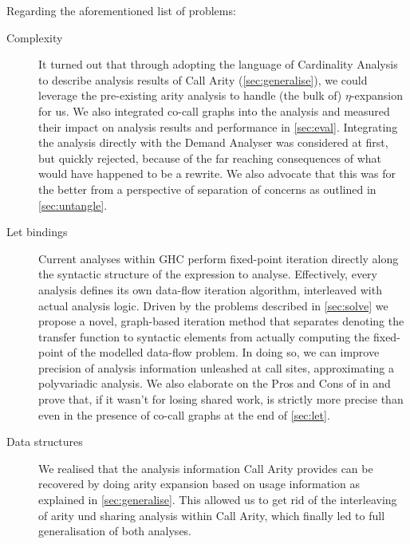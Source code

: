 Regarding the aforementioned list of problems:
\begin{description}
  \item[Complexity]
    It turned out that through adopting the language of Cardinality Analysis to describe analysis results of Call Arity (\cf \cref{sec:generalise}), we could leverage the pre-existing arity analysis to handle (the bulk of) $\eta$-expansion for us.
    We also integrated co-call graphs into the analysis and measured their impact on analysis results and performance in \cref{sec:eval}.
    Integrating the analysis directly with the Demand Analyser was considered at first, but quickly rejected, because of the far reaching consequences of what would have happened to be a rewrite.
    We also advocate that this was for the better from a perspective of separation of concerns as outlined in \cref{sec:untangle}.
  \item[Let bindings]
    Current analyses within GHC perform fixed-point iteration directly along the syntactic structure of the expression to analyse.
    Effectively, every analysis defines its own data-flow iteration algorithm, interleaved with actual analysis logic.
    Driven by the problems described in \cref{sec:solve} we propose a novel, graph-based iteration method that separates denoting the transfer function to syntactic elements from actually computing the fixed-point of the modelled data-flow problem.
    In doing so, we can improve precision of analysis information unleashed at call sites, approximating a polyvariadic analysis.
    We also elaborate on the Pros and Cons of  \vs {} in \textcite{card} and prove that, if it wasn't for losing shared work,  is strictly more precise than  even in the presence of co-call graphs at the end of \cref{sec:let}.
  \item[Data structures]
    We realised that the analysis information Call Arity provides can be recovered by doing arity expansion based on usage information as explained in \cref{sec:generalise}.
    This allowed us to get rid of the interleaving of arity und sharing analysis within Call Arity, which finally led to full generalisation of both analyses.
\end{description}
